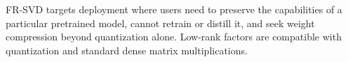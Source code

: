 \documentclass[11pt]{article}
\begin{document}
FR-SVD targets deployment where users need to preserve the capabilities of a particular pretrained model, cannot retrain or distill it, and seek weight compression beyond quantization alone. Low-rank factors are compatible with quantization and standard dense matrix multiplications.


\clearpage
\appendix

\end{document}
